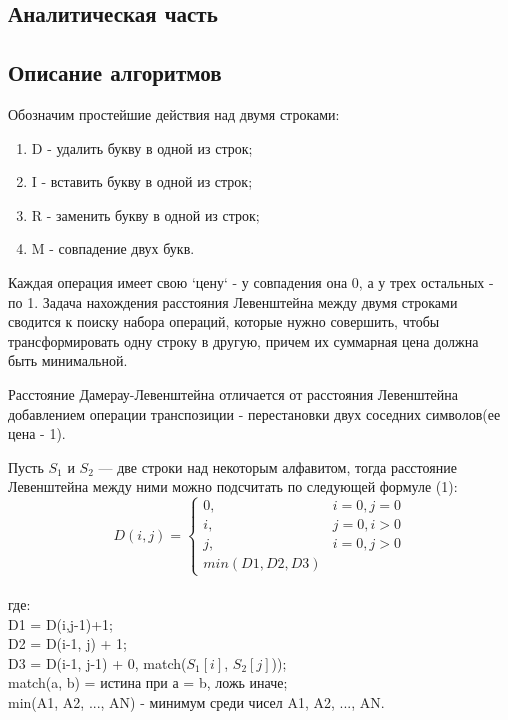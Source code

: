 \documentclass[a4paper,12pt]{report}
\begin{document}
        \label{sec:intro}

    \begin{center}
    	\newpage
        \section{Аналитическая часть}
		\parindent=1cm
        \subsection{Описание алгоритмов}
        \begin{flushleft}
        Обозначим простейшие действия над двумя строками:
        \begin{enumerate}
        	\item D - удалить букву в одной из строк;
        	\item I - вставить букву в одной из строк;
        	\item R - заменить букву в одной из строк;
        	\item M - совпадение двух букв.
        \end{enumerate}
        \parindent=1cm
        Каждая операция имеет свою `цену` - у совпадения она 0, а у трех остальных - по 1.
        Задача нахождения расстояния Левенштейна между двумя строками сводится к поиску набора операций, которые нужно совершить, чтобы трансформировать одну строку в другую, причем их суммарная цена должна быть минимальной.
        
        Расстояние Дамерау-Левенштейна отличается от расстояния Левенштейна добавлением операции транспозиции - перестановки двух соседних символов(ее цена - 1).	
        
        Пусть $S_{1}$ и $S_{2}$ — две строки над некоторым алфавитом, тогда расстояние Левенштейна между ними можно подсчитать по следующей формуле (1):
        \begin{equation}
			D(i,j) = \left\{ \begin{array}{ll}
 			0, & \textrm{$i = 0, j = 0$}\\
 			i, & \textrm{$j = 0, i > 0$}\\
 			j, & \textrm{$i = 0, j > 0$}\\
			min(D1,D2,D3)
  			\end{array} \right.
		\end{equation}
		\\где:\\ 
		D1 = D(i,j-1)+1;\\
		D2 = D(i-1, j) + 1;\\
		D3 = D(i-1, j-1) + 0, match($S_{1}[i]$, $S_{2}[j]$));\\
		match(a, b) = истина при а = b, ложь иначе;\\
		min(A1, A2, ..., AN) - минимум среди чисел A1, A2, ..., AN.\\
		

\end{flushleft}
\end{center}
\end{document}
